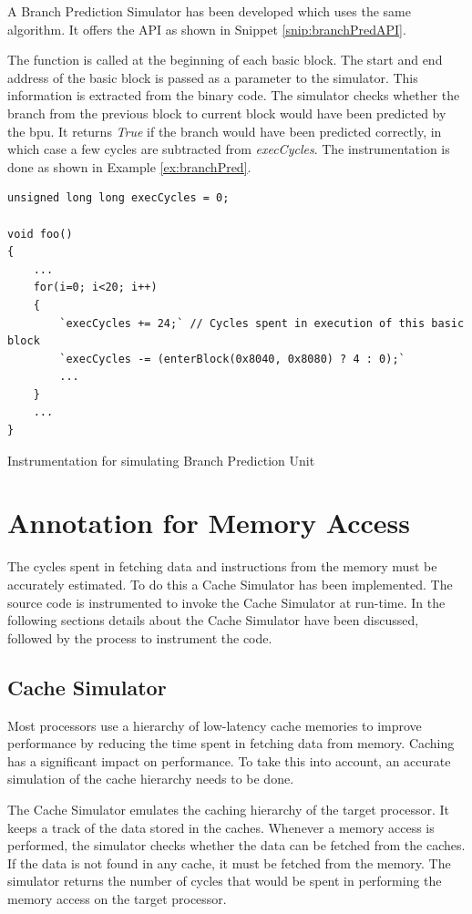 A Branch Prediction Simulator has been developed which uses the same algorithm. It offers the API as shown in Snippet \ref{snip:branchPredAPI}. 

The function is called at the beginning of each basic block. The start and end address of the basic block is passed as a parameter to the simulator. This information is extracted from the binary code. The simulator checks whether the branch from the previous block to current block would have been predicted by the \gls{bpu}. It returns \emph{True} if the branch would have been predicted correctly, in which case a few cycles are subtracted from \emph{execCycles}. The instrumentation is done as shown in Example \ref{ex:branchPred}.

\begin{Example}[h!]
\begin{lstlisting}
unsigned long long execCycles = 0;

void foo()
{
    ...
    for(i=0; i<20; i++)
    {
        `execCycles += 24;` // Cycles spent in execution of this basic block
        `execCycles -= (enterBlock(0x8040, 0x8080) ? 4 : 0);`
        ...
    }
    ...
}
\end{lstlisting}
\caption{Instrumentation for simulating Branch Prediction Unit}
\label{ex:branchPred}
\end{Example}

\section{Annotation for Memory Access}
\label{sec:AnnotMemAccess}
The cycles spent in fetching data and instructions from the memory must be accurately estimated. To do this a Cache Simulator has been implemented. The source code is instrumented to invoke the Cache Simulator at run-time. In the following sections details about the Cache Simulator have been discussed, followed by the process to instrument the code.

\subsection{Cache Simulator}
Most processors use a hierarchy of low-latency cache memories to improve performance by reducing the time spent in fetching data from memory. Caching has a significant impact on performance. To take this into account, an accurate simulation of the cache hierarchy needs to be done.

The Cache Simulator emulates the caching hierarchy of the target processor. It keeps a track of the data stored in the caches. Whenever a memory access is performed, the simulator checks whether the data can be fetched from the caches. If the data is not found in any cache, it must be fetched from the memory. The simulator returns the number of cycles that would be spent in performing the memory access on the target processor.

